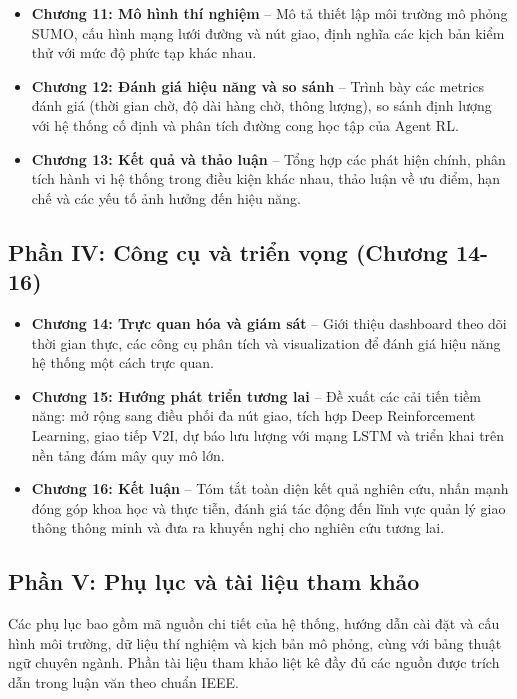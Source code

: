 \begin{itemize}[leftmargin=1.5em]
    \item \textbf{Chương 11: Mô hình thí nghiệm} -- Mô tả thiết lập môi trường mô phỏng SUMO, cấu hình mạng lưới đường và nút giao, định nghĩa các kịch bản kiểm thử với mức độ phức tạp khác nhau.
    
    \item \textbf{Chương 12: Đánh giá hiệu năng và so sánh} -- Trình bày các metrics đánh giá (thời gian chờ, độ dài hàng chờ, thông lượng), so sánh định lượng với hệ thống cố định và phân tích đường cong học tập của Agent RL.
    
    \item \textbf{Chương 13: Kết quả và thảo luận} -- Tổng hợp các phát hiện chính, phân tích hành vi hệ thống trong điều kiện khác nhau, thảo luận về ưu điểm, hạn chế và các yếu tố ảnh hưởng đến hiệu năng.
\end{itemize}

\subsection*{Phần IV: Công cụ và triển vọng (Chương 14-16)}

\begin{itemize}[leftmargin=1.5em]
    \item \textbf{Chương 14: Trực quan hóa và giám sát} -- Giới thiệu dashboard theo dõi thời gian thực, các công cụ phân tích và visualization để đánh giá hiệu năng hệ thống một cách trực quan.
    
    \item \textbf{Chương 15: Hướng phát triển tương lai} -- Đề xuất các cải tiến tiềm năng: mở rộng sang điều phối đa nút giao, tích hợp Deep Reinforcement Learning, giao tiếp V2I, dự báo lưu lượng với mạng LSTM và triển khai trên nền tảng đám mây quy mô lớn.
    
    \item \textbf{Chương 16: Kết luận} -- Tóm tắt toàn diện kết quả nghiên cứu, nhấn mạnh đóng góp khoa học và thực tiễn, đánh giá tác động đến lĩnh vực quản lý giao thông thông minh và đưa ra khuyến nghị cho nghiên cứu tương lai.
\end{itemize}

\subsection*{Phần V: Phụ lục và tài liệu tham khảo}

Các phụ lục bao gồm mã nguồn chi tiết của hệ thống, hướng dẫn cài đặt và cấu hình môi trường, dữ liệu thí nghiệm và kịch bản mô phỏng, cùng với bảng thuật ngữ chuyên ngành. Phần tài liệu tham khảo liệt kê đầy đủ các nguồn được trích dẫn trong luận văn theo chuẩn IEEE.